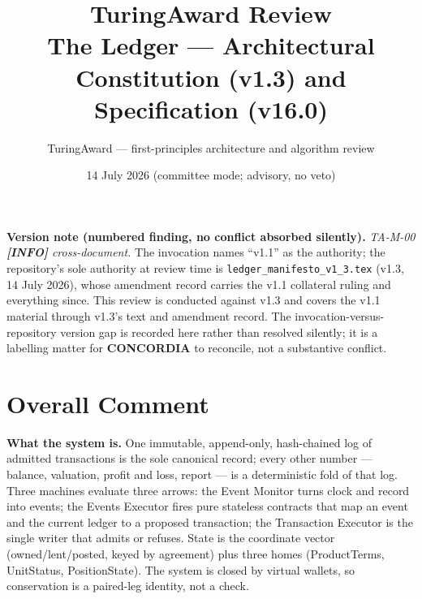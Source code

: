 \documentclass[11pt,a4paper]{article}
\title{\vspace{-2em}TuringAward Review\\[2pt]
\large The Ledger --- Architectural Constitution (v1.3) and Specification (v16.0)}
\author{TuringAward --- first-principles architecture and algorithm review}
\date{14 July 2026 \quad(committee mode; advisory, no veto)}
\newcommand{\sev}[1]{\textbf{[#1]}}
\newcommand{\lens}[1]{\textnormal{#1}}
\begin{document}
\maketitle
\vspace{-1.5em}

\noindent\textbf{Version note (numbered finding, no conflict absorbed silently).}
\emph{TA-M-00 \sev{INFO} \lens{cross-document}.} The invocation names ``v1.1'' as the
authority; the repository's sole authority at review time is
\texttt{ledger\_manifesto\_v1\_3.tex} (v1.3, 14 July 2026), whose amendment record carries
the v1.1 collateral ruling and everything since. This review is conducted against v1.3 and
covers the v1.1 material through v1.3's text and amendment record. The invocation-versus-repository
version gap is recorded here rather than resolved silently; it is a labelling matter for
\textbf{CONCORDIA} to reconcile, not a substantive conflict.

\section{Overall Comment}

\textbf{What the system is.} One immutable, append-only, hash-chained log of admitted
transactions is the sole canonical record; every other number --- balance, valuation, profit
and loss, report --- is a deterministic fold of that log. Three machines evaluate three
arrows: the Event Monitor turns clock and record into events; the Events Executor fires pure
stateless contracts that map an event and the current ledger to a proposed transaction; the
Transaction Executor is the single writer that admits or refuses. State is the coordinate
vector (owned/lent/posted, keyed by agreement) plus three homes (ProductTerms, UnitStatus,
PositionState). The system is closed by virtual wallets, so conservation is a paired-leg
identity, not a check.
\end{document}
